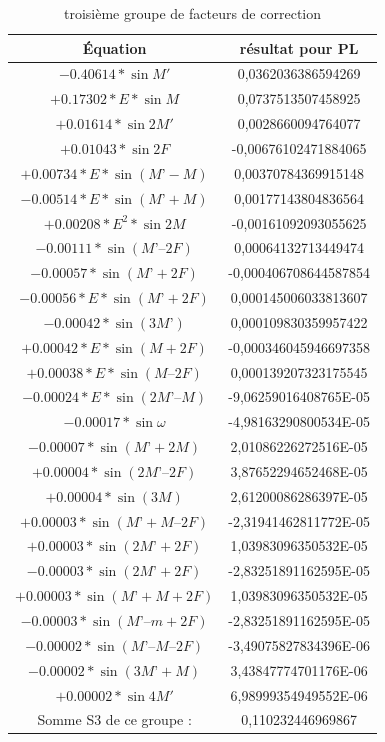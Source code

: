 \begin{table}[H]
	\caption{troisième groupe de facteurs de correction}
	\label{troisième groupe de facteurs de correction}
	\begin{center}
		\begin{tabular}{|c|c|}
		\hline 
		Équation & résultat pour  PL \\ 
		\hline 
		$-0.40614 * \sin M' $ & 0,0362036386594269\\
		\hline
		$+0.17302 * E  * \sin M $ & 0,0737513507458925\\
		\hline
		$+0.01614 * \sin 2M' $ & 0,0028660094764077\\
		\hline
		$+0.01043 * \sin 2F$ & -0,00676102471884065\\ 
		\hline
		$+0.00734 * E  * \sin (M’ - M)$ & 0,00370784369915148\\ 
		\hline
		$-0.00514 * E * \sin (M’ +M )$ & 0,00177143804836564\\ 
		\hline
		$+0.00208 * E^{2} * \sin 2M$ & -0,00161092093055625\\ 
		\hline
		$-0.00111* \sin (M’ – 2F)$ & 0,00064132713449474\\ 
		\hline
		$-0.00057 * \sin (M’ + 2F)$ & -0,000406708644587854 \\ 
		\hline
		$-0.00056 *E * \sin (M’ + 2F)$ & 0,000145006033813607\\ 
		\hline
		$-0.00042 * \sin (3M’) $ & 0,000109830359957422\\ 
		\hline
		$+0.00042 * E  * \sin (M + 2F)$ & -0,000346045946697358\\ 
		\hline
		$+0.00038 * E  * \sin (M – 2F)$ & 0,000139207323175545\\ 
		\hline
		$-0.00024 * E   * \sin (2M’ – M )$ & -9,06259016408765E-05\\ 
		\hline
		$-0.00017  * \sin \omega $ & -4,98163290800534E-05\\ 
		\hline
		$-0.00007  * \sin (M’ + 2M)$ & 2,01086226272516E-05\\ 
		\hline
		$+0.00004 * \sin (2M’ – 2F)$ & 3,87652294652468E-05\\ 
		\hline
		$+0.00004  * \sin (3M)$ & 2,61200086286397E-05\\ 
		\hline
		$+0.00003 * \sin (M’ + M – 2F)$ & -2,31941462811772E-05\\ 
		\hline
		$+0.00003 * \sin (2M’ + 2 F )$ & 1,03983096350532E-05\\ 
		\hline
		$-0.00003   * \sin (2M’ + 2F)$ & -2,83251891162595E-05\\ 
		\hline
		$+0.00003   * \sin (M’ + M + 2F )$ & 1,03983096350532E-05\\ 
		\hline
		$-0.00003 * \sin (M’ – m + 2F )$ & -2,83251891162595E-05\\ 
		\hline
		$-0.00002    * \sin (M’ – M – 2F)$ & -3,49075827834396E-06\\ 
		\hline
		$-0.00002    * \sin (3M’ + M )$ & 3,43847774701176E-06\\ 
		\hline
		$+0.00002  * \sin 4M' $ & 6,98999354949552E-06\\ 
		\hline
		Somme S3 de ce groupe : &0,110232446969867\\ 
		\hline
		\end{tabular}
	\end{center} 
\end{table}
